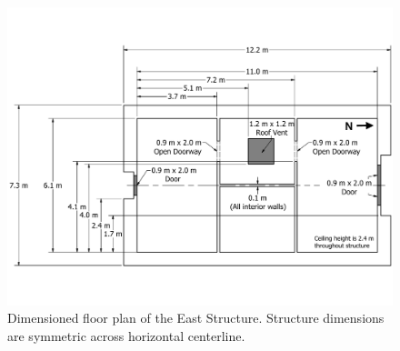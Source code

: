 \begin{figure}[!h]
	\centering
	\includegraphics[width=\columnwidth]{Figures/Floor_Plans/East_Structure_Dimensioned_Full}
	\caption[Dimensioned floor plan of the East Structure]{Dimensioned floor plan of the East Structure. Structure dimensions are symmetric across horizontal centerline.}
	\label{fig:east_dimensioned_plan}
\end{figure}

